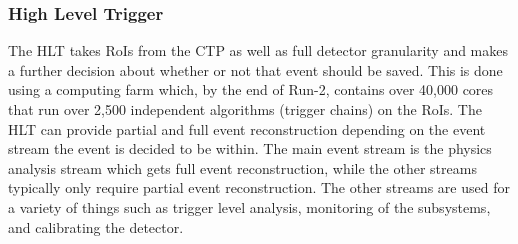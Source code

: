 \subsubsection{High Level Trigger}
The HLT takes RoIs from the CTP as well as full detector granularity and makes a further decision about whether or not that event should be saved.  This is done using a computing farm which, by the end of Run-2, contains over 40,000 cores that run over 2,500 independent algorithms (trigger chains) on the RoIs.  The HLT can provide partial and full event reconstruction depending on the event stream the event is decided to be within.  The main event stream is the physics analysis stream which gets full event reconstruction, while the other streams typically only require partial event reconstruction.  The other streams are used for a variety of things such as trigger level analysis, monitoring of the subsystems, and calibrating the detector.














